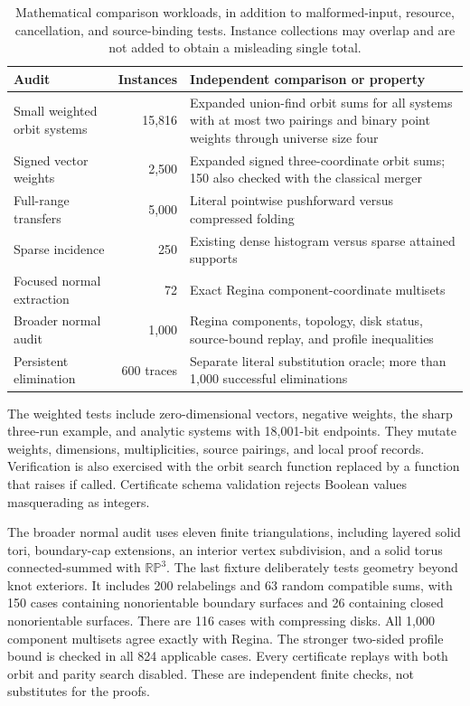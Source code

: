 \documentclass[11pt,a4paper]{article}
\theoremstyle{definition}
\theoremstyle{remark}
\begin{document}
\begin{table}[htbp]
\centering\small
\begin{tabularx}{\textwidth}{@{}p{}rY@{}}
\toprule
Audit & Instances & Independent comparison or property\\
\midrule
Small weighted orbit systems & 15,816 & Expanded union-find orbit sums for all
systems with at most two pairings and binary point weights through universe size four\\
Signed vector weights & 2,500 & Expanded signed three-coordinate orbit sums;
150 also checked with the classical merger\\
Full-range transfers & 5,000 & Literal pointwise pushforward versus compressed folding\\
Sparse incidence & 250 & Existing dense histogram versus sparse attained supports\\
Focused normal extraction & 72 & Exact Regina component-coordinate multisets\\
Broader normal audit & 1,000 & Regina components, topology, disk status,
source-bound replay, and profile inequalities\\
Persistent elimination & 600 traces & Separate literal substitution oracle;
more than 1,000 successful eliminations\\
\bottomrule
\end{tabularx}
\caption{Mathematical comparison workloads, in addition to malformed-input,
resource, cancellation, and source-binding tests. Instance collections may
overlap and are not added to obtain a misleading single total.}
\label{tab:audits}
\end{table}

The weighted tests include zero-dimensional vectors, negative weights,
the sharp three-run example, and analytic systems with 18,001-bit
endpoints. They mutate weights, dimensions, multiplicities, source pairings,
and local proof records. Verification is also exercised with the orbit
search function replaced by a function that raises if called. Certificate
schema validation rejects Boolean values masquerading as integers.

The broader normal audit uses eleven finite triangulations, including
layered solid tori, boundary-cap extensions, an interior vertex subdivision, and a solid
torus connected-summed with $\mathbb{RP}^3$. The last fixture deliberately
tests geometry beyond knot exteriors. It includes 200 relabelings and 63
random compatible sums, with 150 cases containing nonorientable boundary
surfaces and 26 containing closed nonorientable surfaces. There are 116
cases with compressing disks. All 1,000 component multisets agree exactly
with Regina. The stronger two-sided profile bound is checked in all 824
applicable cases. Every certificate replays with both orbit and parity
search disabled. These are independent finite checks, not substitutes for
the proofs.
\end{document}
